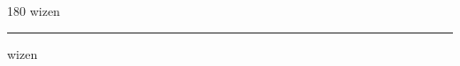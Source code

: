 
\begin{frame}
\begin{center}
\begin{turn}{180}
{\fontsize{2.5cm}{1em}\selectfont wizen}
\end{turn}
\vspace{1em}\par  
\hrule
\vspace{1em}\par  
{\fontsize{2.5cm}{1em}\selectfont wizen}
\end{center}
\end{frame}
